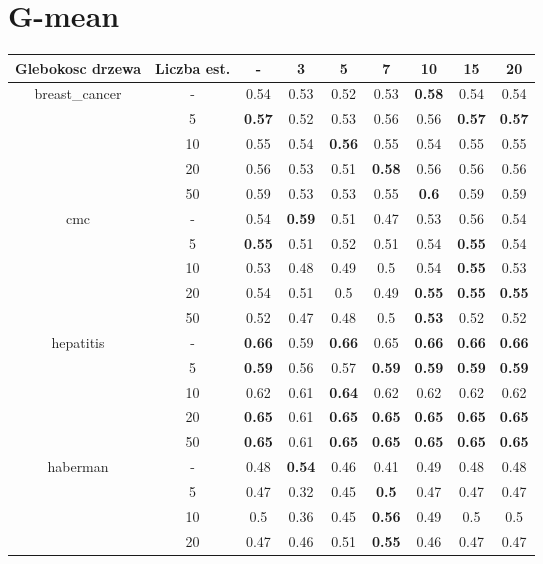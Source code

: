 \documentclass{article}%
\begin{document}
\section*{G{-}mean}%
\begin{tabular}{c|c|ccccccc}%
\hline%
Glebokosc drzewa&Liczba est.&{-}&3&5&7&10&15&20\\%
\hline%
\multirow{5}{*}{breast\_cancer}&{-}&0.54&0.53&0.52&0.53&\textbf{0.58}&0.54&0.54\\%
\cline{2%
-%
9}%
&5&\textbf{0.57}&0.52&0.53&0.56&0.56&\textbf{0.57}&\textbf{0.57}\\%
\cline{2%
-%
9}%
&10&0.55&0.54&\textbf{0.56}&0.55&0.54&0.55&0.55\\%
\cline{2%
-%
9}%
&20&0.56&0.53&0.51&\textbf{0.58}&0.56&0.56&0.56\\%
\cline{2%
-%
9}%
&50&0.59&0.53&0.53&0.55&\textbf{0.6}&0.59&0.59\\%
\hline%
\multirow{5}{*}{cmc}&{-}&0.54&\textbf{0.59}&0.51&0.47&0.53&0.56&0.54\\%
\cline{2%
-%
9}%
&5&\textbf{0.55}&0.51&0.52&0.51&0.54&\textbf{0.55}&0.54\\%
\cline{2%
-%
9}%
&10&0.53&0.48&0.49&0.5&0.54&\textbf{0.55}&0.53\\%
\cline{2%
-%
9}%
&20&0.54&0.51&0.5&0.49&\textbf{0.55}&\textbf{0.55}&\textbf{0.55}\\%
\cline{2%
-%
9}%
&50&0.52&0.47&0.48&0.5&\textbf{0.53}&0.52&0.52\\%
\hline%
\multirow{5}{*}{hepatitis}&{-}&\textbf{0.66}&0.59&\textbf{0.66}&0.65&\textbf{0.66}&\textbf{0.66}&\textbf{0.66}\\%
\cline{2%
-%
9}%
&5&\textbf{0.59}&0.56&0.57&\textbf{0.59}&\textbf{0.59}&\textbf{0.59}&\textbf{0.59}\\%
\cline{2%
-%
9}%
&10&0.62&0.61&\textbf{0.64}&0.62&0.62&0.62&0.62\\%
\cline{2%
-%
9}%
&20&\textbf{0.65}&0.61&\textbf{0.65}&\textbf{0.65}&\textbf{0.65}&\textbf{0.65}&\textbf{0.65}\\%
\cline{2%
-%
9}%
&50&\textbf{0.65}&0.61&\textbf{0.65}&\textbf{0.65}&\textbf{0.65}&\textbf{0.65}&\textbf{0.65}\\%
\hline%
\multirow{5}{*}{haberman}&{-}&0.48&\textbf{0.54}&0.46&0.41&0.49&0.48&0.48\\%
\cline{2%
-%
9}%
&5&0.47&0.32&0.45&\textbf{0.5}&0.47&0.47&0.47\\%
\cline{2%
-%
9}%
&10&0.5&0.36&0.45&\textbf{0.56}&0.49&0.5&0.5\\%
\cline{2%
-%
9}%
&20&0.47&0.46&0.51&\textbf{0.55}&0.46&0.47&0.47\\%

\end{tabular}
\end{document}
